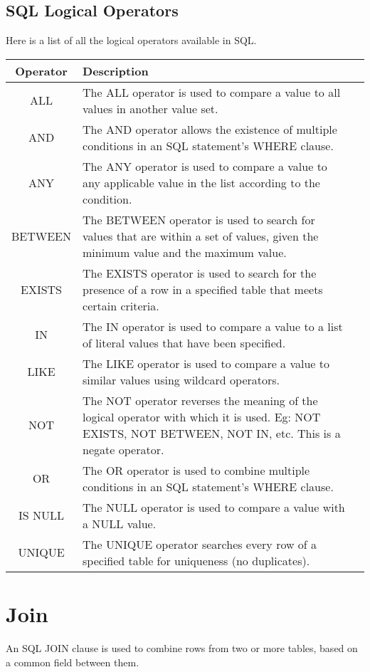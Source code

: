 \subsection{SQL Logical Operators}
Here is a list of all the logical operators available in SQL.

\begin{center}
	\begin{tabular}{|c|p{12cm}|c|}
		\hline
		Operator	&	Description \\
		\hline
		ALL	& The ALL operator is used to compare a value to all values in another value set.\\
		AND	& The AND operator allows the existence of multiple conditions in an SQL statement's WHERE clause.\\
		ANY	& The ANY operator is used to compare a value to any applicable value in the list according to the condition.\\
		BETWEEN	& The BETWEEN operator is used to search for values that are within a set of values, given the minimum value and the maximum value.\\
		EXISTS	& The EXISTS operator is used to search for the presence of a row in a specified table that meets certain criteria.\\
		IN	& The IN operator is used to compare a value to a list of literal values that have been specified.\\
		LIKE	& The LIKE operator is used to compare a value to similar values using wildcard operators.\\
		NOT	& The NOT operator reverses the meaning of the logical operator with which it is used. Eg: NOT EXISTS, NOT BETWEEN, NOT IN, etc. This is a negate operator.\\
		OR	& The OR operator is used to combine multiple conditions in an SQL statement's WHERE clause.\\
		IS NULL	& The NULL operator is used to compare a value with a NULL value.\\
		UNIQUE	& The UNIQUE operator searches every row of a specified table for uniqueness (no duplicates).\\
		\hline
	\end{tabular}
\end{center}

\section{Join}

An SQL JOIN clause is used to combine rows from two or more tables, based on a common field between them.

